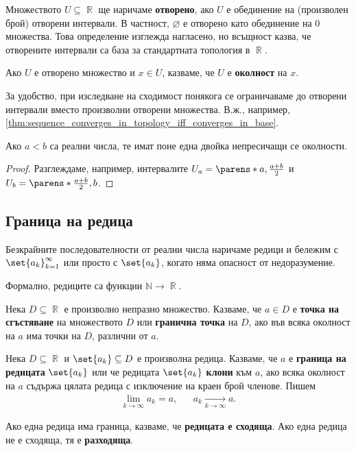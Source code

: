 \documentclass{../../common/topic}
\begin{document}
\begin{definition}
  Множеството \( U \subseteq \BbbR \) ще наричаме \textbf{отворено}, ако \( U \) е обединение на (произволен брой) отворени интервали. В частност, \( \varnothing \) е отворено като обединение на \( 0 \) множества. Това определение изглежда нагласено, но всъщност казва, че отворените интервали са база за стандартната топология в \( \BbbR \).

  Ако \( U \) е отворено множество и \( x \in U \), казваме, че \( U \) е \textbf{околност} на \( x \).
\end{definition}

За удобство, при изследване на сходимост понякога се ограничаваме до отворени интервали вместо произволни отворени множества. В.ж., например, \cref{thm:sequence_converges_in_topology_iff_converges_in_base}.

\begin{lemma}\label{thm:real_numbers_are_hausdorff}
  Ако \( a < b \) са реални числа, те имат поне една двойка непресичащи се околности.
\end{lemma}
\begin{proof}
  Разглеждаме, например, интервалите \( U_a = \parens*{a, \tfrac {a + b} 2 } \) и \( U_b = \parens*{\tfrac {a + b} 2, b} \).
\end{proof}

\subsection{Граница на редица}

\begin{definition}
  Безкрайните последователности от реални числа наричаме редици и бележим с \( {\set{ a_k }}_{k=1}^\infty \) или просто с \( \set{ a_k } \), когато няма опасност от недоразумение.

  Формално, редиците са функции \( \mathbb{N} \to \BbbR \).
\end{definition}

\begin{definition}
  Нека \( D \subseteq \BbbR \) е произволно непразно множество. Казваме, че \( a \in D \) е \textbf{точка на сгъстяване} на множеството \( D \) или \textbf{гранична точка} на \( D \), ако във всяка околност на \( a \) има точки на \( D \), различни от \( a \).
\end{definition}

\begin{definition}
  Нека \( D \subseteq \BbbR \) и \( \set{ a_k } \subseteq D \) е произволна редица. Казваме, че \( a \) е \textbf{граница на редицата} \( \set{ a_k } \) или че редицата \( \set{ a_k } \) \textbf{клони} към \( a \), ако всяка околност на \( a \) съдържа цялата редица с изключение на краен брой членове. Пишем
  \begin{align*}
    \lim_{k \to \infty} a_k = a,
    &&
    a_k \xrightarrow[k \to \infty]{} a.
  \end{align*}

  Ако една редица има граница, казваме, че \textbf{редицата е сходяща}. Ако една редица не е сходяща, тя е \textbf{разходяща}.
\end{definition}
\end{document}
